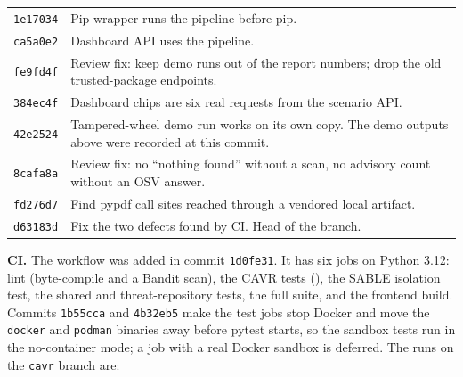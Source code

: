 \begin{longtable}{p{}p{}}
\texttt{1e17034} & Pip wrapper runs the pipeline before pip.\\
\texttt{ca5a0e2} & Dashboard API uses the pipeline.\\
\texttt{fe9fd4f} & Review fix: keep demo runs out of the report numbers; drop the old trusted-package endpoints.\\
\texttt{384ec4f} & Dashboard chips are six real requests from the scenario API.\\
\texttt{42e2524} & Tampered-wheel demo run works on its own copy. The demo outputs above were recorded at this commit.\\
\texttt{8cafa8a} & Review fix: no ``nothing found'' without a scan, no advisory count without an OSV answer.\\
\texttt{fd276d7} & Find pypdf call sites reached through a vendored local artifact.\\
\texttt{d63183d} & Fix the two defects found by CI. Head of the branch.\\
\bottomrule
\end{longtable}
\setlength{\tabcolsep}{6pt}

\begin{sloppypar}
\textbf{CI.} The workflow  was added in commit \texttt{1d0fe31}. It has six jobs on Python 3.12: lint (byte-compile and a Bandit scan), the CAVR tests (), the SABLE isolation test, the shared and threat-repository tests, the full suite, and the frontend build. Commits \texttt{1b55cca} and \texttt{4b32eb5} make the test jobs stop Docker and move the \texttt{docker} and \texttt{podman} binaries away before pytest starts, so the sandbox tests run in the no-container mode; a job with a real Docker sandbox is deferred. The runs on the \texttt{cavr} branch are:
\end{sloppypar}

